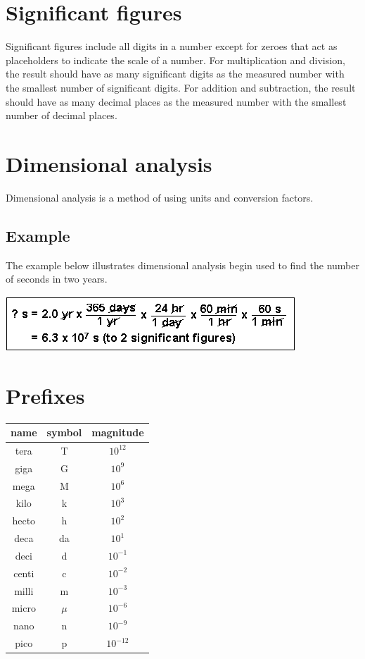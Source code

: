 \documentclass[]{article}
\begin{document}
\section{Significant figures}

Significant figures include all digits in a number except for zeroes that act as placeholders to indicate the scale of a number. 
For multiplication and division, the result should have as many significant digits as the measured number with the smallest number of significant digits.
For addition and subtraction, the result should have as many decimal places as the measured number with the smallest number of decimal places.

\section{Dimensional analysis}

Dimensional analysis is a method of using units and conversion factors.

\subsection{Example}
The example below illustrates dimensional analysis begin used to find the number of seconds in two years.

\includegraphics{dimensional_analysis.png}

\section{Prefixes}

\vspace{.5cm}
\begin{tabular}{ | c | c | c | }
    \hline
    name & symbol & magnitude \\ \hline
    tera & T & $10^{12}$ \\ \hline
    giga & G & $10^9$ \\ \hline
    mega & M & $10^6$ \\ \hline
    kilo & k & $10^3$ \\ \hline
    hecto & h & $10^2$ \\ \hline
    deca & da & $10^1$ \\ \hline
    deci & d & $10^{-1}$ \\ \hline
    centi & c & $10^{-2}$ \\ \hline
    milli & m & $10^{-3}$ \\ \hline
    micro & $\mu$ & $10^{-6}$ \\ \hline
    nano & n & $10^{-9}$ \\ \hline
    pico & p & $10^{-12}$ \\ \hline
\end{tabular}
\end{document}
